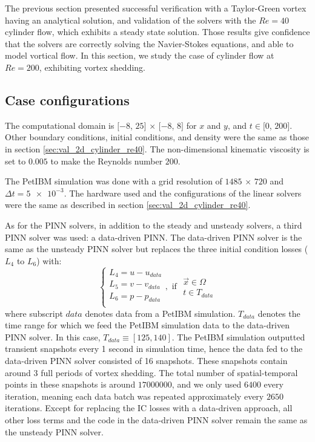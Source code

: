 
The previous section presented successful verification with a Taylor-Green vortex having an analytical solution, and validation of the solvers with the $Re=40$ cylinder flow, which exhibits a steady state solution.
Those results give confidence that the solvers are correctly solving the Navier-Stokes equations, and able to model vortical flow. In this section, we study the case of cylinder flow at $Re=200$, exhibiting vortex shedding.

\subsection{Case configurations}

The computational domain is $[-8$, $25]$ $\times$ $[-8$, $8]$ for $x$ and $y$, and $t\in[0$, $200]$.
Other boundary conditions, initial conditions, and density were the same as those in section \ref{sec:val_2d_cylinder_re40}.
The non-dimensional kinematic viscosity is set to $0.005$ to make the Reynolds number $200$.

The PetIBM simulation was done with a grid resolution of $1485$ $\times$ $720$ and $\Delta t = \num{5e-3}$.
The hardware used and the configurations of the linear solvers were the same as described in section \ref{sec:val_2d_cylinder_re40}.

As for the PINN solvers, in addition to the steady and unsteady solvers, a third PINN solver was used: a data-driven PINN.
The data-driven PINN solver is the same as the unsteady PINN solver but replaces the three initial condition losses ($L_4$ to $L_6$) with:
\begin{equation}\label{eq:data-driven-loss}
    \left\{
        \begin{array}{l}
            L_4 = u - u_{data}\\
            L_5 = v - v_{data}\\
            L_6 = p - p_{data}\\
        \end{array}
    \right.
    ,\text{ if }
    \begin{array}{l}
        \vec{x} \in \Omega \\
        t \in T_{data}
    \end{array}
\end{equation}
where subscript $data$ denotes data from a PetIBM simulation.
$T_{data}$ denotes the time range for which we feed the PetIBM simulation data to the data-driven PINN solver.
In this case, $T_{data} \equiv \left[125, 140\right]$.
The PetIBM simulation outputted transient snapshots every 1 second in simulation time, hence the data fed to the data-driven PINN solver consisted of 16 snapshots.
These snapshots contain around $3$ full periods of vortex shedding.
The total number of spatial-temporal points in these snapshots is around $\num{17000000}$, and we only used $\num{6400}$ every iteration, meaning each data batch was repeated approximately every $\num{2650}$ iterations.
Except for replacing the IC losses with a data-driven approach, all other loss terms and the code in the data-driven PINN solver remain the same as the unsteady PINN solver.

